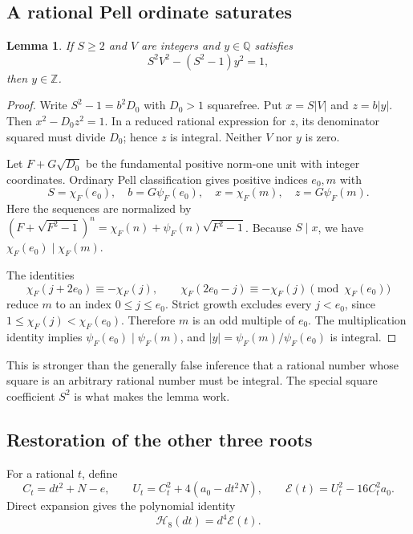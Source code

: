 \documentclass[11pt,letterpaper]{article}
\newtheorem{lemma}[theorem]{Lemma}
\theoremstyle{remark}\newtheorem{remark}[theorem]{Remark}
\newcommand{\Z}{\mathbb Z}\newcommand{\N}{\mathbb N}\newcommand{\pos}{\mathbb Z_{>0}}
\begin{document}
\subsection{A rational Pell ordinate saturates}
\begin{lemma}\label{lem:saturation}
If $S\geq2$ and $V$ are integers and $y\in\mathbb Q$ satisfies
\[
 S^2V^2-(S^2-1)y^2=1,
\]
then $y\in\Z$.
\end{lemma}
\begin{proof}
Write $S^2-1=b^2D_0$ with $D_0>1$ squarefree. Put
$x=S|V|$ and $z=b|y|$. Then $x^2-D_0z^2=1$. In a reduced rational
expression for $z$, its denominator squared must divide $D_0$; hence $z$ is
integral. Neither $V$ nor $y$ is zero.

Let $F+G\sqrt{D_0}$ be the fundamental positive norm-one unit with integer
coordinates. Ordinary Pell classification gives positive indices $e_0,m$ with
\[
 S=\chi_F(e_0),\quad b=G\psi_F(e_0),\quad
 x=\chi_F(m),\quad z=G\psi_F(m).
\]
Here the sequences are normalized by
$(F+\sqrt{F^2-1})^n=\chi_F(n)+\psi_F(n)\sqrt{F^2-1}$.
Because $S\mid x$, we have $\chi_F(e_0)\mid\chi_F(m)$.

The identities
\[
 \chi_F(j+2e_0)\equiv-\chi_F(j),\qquad
 \chi_F(2e_0-j)\equiv-\chi_F(j)
 \pmod{\chi_F(e_0)}
\]
reduce $m$ to an index $0\leq j\leq e_0$. Strict growth excludes every
$j<e_0$, since $1\leq\chi_F(j)<\chi_F(e_0)$. Therefore $m$ is an odd
multiple of $e_0$. The multiplication identity implies
$\psi_F(e_0)\mid\psi_F(m)$, and
$|y|=\psi_F(m)/\psi_F(e_0)$ is integral.
\end{proof}

This is stronger than the generally false inference that a rational number
whose square is an arbitrary rational number must be integral. The special
square coefficient $S^2$ is what makes the lemma work.

\subsection{Restoration of the other three roots}
For a rational $t$, define
\[
 C_t=dt^2+N-e,\qquad
 U_t=C_t^2+4(a_0-dt^2N),\qquad
 \mathcal E(t)=U_t^2-16C_t^2a_0.
\]
Direct expansion gives the polynomial identity
\begin{equation}\label{eq:monicidentity}
 \mathcal H_8(dt)=d^4\mathcal E(t).
\end{equation}
\end{document}
